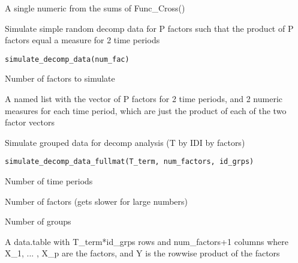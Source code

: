 \documentclass[a4paper]{book}
\begin{document}
%
\begin{Value}
A single numeric from the sums of Func\_Cross()
\end{Value}
%
\begin{Description}\relax
Simulate simple random decomp data for P factors such that the
product of P factors equal a measure for 2 time periods
\end{Description}
%
\begin{Usage}
\begin{verbatim}
simulate_decomp_data(num_fac)
\end{verbatim}
\end{Usage}
%
\begin{Arguments}
\begin{ldescription}
\item[\code{num\_fac}] Number of factors to simulate
\end{ldescription}
\end{Arguments}
%
\begin{Value}
A named list with the vector of P factors for 2 time periods,
and 2 numeric measures for each time period, which are just the
product of each of the two factor vectors
\end{Value}
%
\begin{Description}\relax
Simulate grouped data for decomp analysis (T by IDI by factors)
\end{Description}
%
\begin{Usage}
\begin{verbatim}
simulate_decomp_data_fullmat(T_term, num_factors, id_grps)
\end{verbatim}
\end{Usage}
%
\begin{Arguments}
\begin{ldescription}
\item[\code{T\_term}] Number of time periods

\item[\code{num\_factors}] Number of factors (gets slower for large numbers)

\item[\code{id\_grps}] Number of groups
\end{ldescription}
\end{Arguments}
%
\begin{Value}
A data.table with T\_term*id\_grps rows and num\_factors+1 columns
where X\_1, ... , X\_p are the factors, and Y is the rowwise product of the
factors
\end{Value}
\printindex{}
\end{document}
